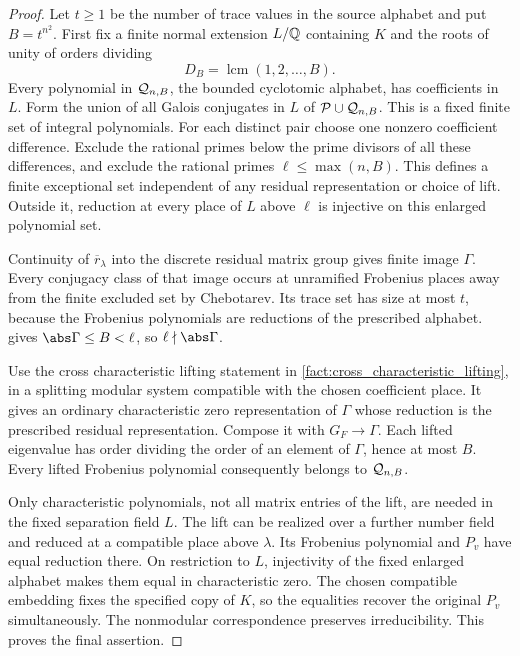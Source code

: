 \begin{proof}
Let \(t\ge1\) be the number of trace values in the source alphabet and put \(B=t^{n^2}\). First fix a finite normal extension \(L/\mathbb Q\) containing \(K\) and the roots of unity of orders dividing
\[
 D_B=\operatorname{lcm}(1,2,\ldots,B).
\]
Every polynomial in \(\mathcal Q_{n,B}\), the bounded cyclotomic alphabet, has coefficients in \(L\). Form the union of all Galois conjugates in \(L\) of \(\mathcal P\cup\mathcal Q_{n,B}\). This is a fixed finite set of integral polynomials. For each distinct pair choose one nonzero coefficient difference. Exclude the rational primes below the prime divisors of all these differences, and exclude the rational primes \(\ell\le\max(n,B)\). This defines a finite exceptional set independent of any residual representation or choice of lift. Outside it, reduction at every place of \(L\) above \(\ell\) is injective on this enlarged polynomial set.

Continuity of \(\overline r_\lambda\) into the discrete residual matrix group gives finite image \(\Gamma\). Every conjugacy class of that image occurs at unramified Frobenius places away from the finite excluded set by Chebotarev. Its trace set has size at most \(t\), because the Frobenius polynomials are reductions of the prescribed alphabet.  gives \(\abs\Gamma\le B<\ell\), so \(\ell\nmid\abs\Gamma\).

Use the cross characteristic lifting statement in \cref{fact:cross_characteristic_lifting}, in a splitting modular system compatible with the chosen coefficient place. It gives an ordinary characteristic zero representation of \(\Gamma\) whose reduction is the prescribed residual representation. Compose it with \(G_F\to\Gamma\). Each lifted eigenvalue has order dividing the order of an element of \(\Gamma\), hence at most \(B\). Every lifted Frobenius polynomial consequently belongs to \(\mathcal Q_{n,B}\).

Only characteristic polynomials, not all matrix entries of the lift, are needed in the fixed separation field \(L\). The lift can be realized over a further number field and reduced at a compatible place above \(\lambda\). Its Frobenius polynomial and \(P_v\) have equal reduction there. On restriction to \(L\), injectivity of the fixed enlarged alphabet makes them equal in characteristic zero. The chosen compatible embedding fixes the specified copy of \(K\), so the equalities recover the original \(P_v\) simultaneously. The nonmodular correspondence preserves irreducibility. This proves the final assertion.
\end{proof}

